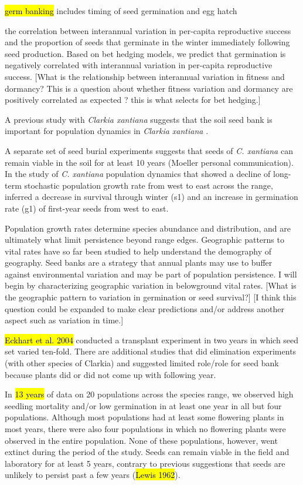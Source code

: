 \documentclass[12pt, oneside, titlepage]{article}   	%
\begin{document}
{\hl{germ banking} includes timing of seed germination and egg hatch 


the correlation between interannual variation in per-capita reproductive success and the proportion of seeds that germinate in the winter immediately following seed production. Based on bet hedging models, we predict that germination is negatively correlated with interannual variation in per-capita reproductive success. [What is the relationship between interannual variation in fitness and dormancy? This is a question about whether fitness variation and dormancy are positively correlated as expected ? this is what selects for bet hedging.]

 A previous study with \textit{Clarkia xantiana} suggests that the soil seed bank is important for population dynamics in \textit{Clarkia xantiana} . 


A separate set of seed burial experiments suggests that seeds of \textit{C. xantiana} can remain viable in the soil for at least 10 years (Moeller personal communication). In the study of \textit{C. xantiana} population dynamics that showed a decline of long-term stochastic population growth rate from west to east across the range, \cite{eckhart2011} inferred a decrease in survival through winter (s1) and an increase in germination rate (g1) of first-year seeds from west to east.

Population growth rates determine species abundance and distribution, and are ultimately what limit persistence beyond range edges. Geographic patterns to vital rates have so far been studied to help understand the demography of geography. Seed banks are a strategy that annual plants may use to buffer against environmental variation and may be part of population persistence. I will begin by characterizing geographic variation in belowground vital rates. [What is the geographic pattern to variation in germination or seed survival?] [I think this question could be expanded to make clear predictions and/or address another aspect such as variation in time.]

\hl{Eckhart et al. 2004} conducted a transplant experiment in two years in which seed set varied ten-fold. There are additional studies that did elimination experiments (with other species of Clarkia) and suggested limited role/role for seed bank because plants did or did not come up with following year. 

In \hl{13 years} of data on 20 populations across the species range, we observed high seedling mortality and/or low germination in at least one year in all but four populations. Although most populations had at least some flowering plants in most years, there were also four populations in which no flowering plants were observed in the entire population. None of these populations, however, went extinct during the period of the study. Seeds can remain viable in the field and laboratory for at least 5 years, contrary to previous suggestions that seeds are unlikely to persist past a few years (\hl{Lewis 1962}). 


}
\end{document}
